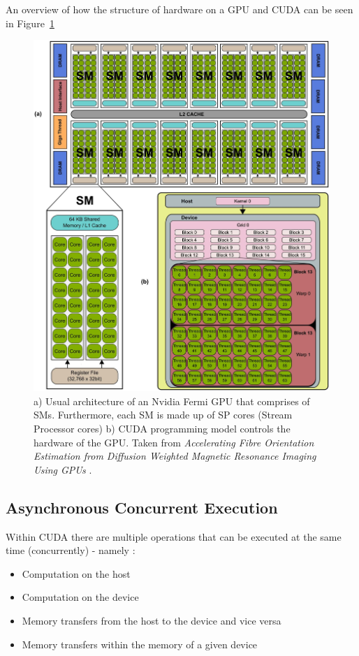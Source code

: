 \par An overview of how the structure of hardware on a GPU and CUDA can be seen in Figure~\ref{Figure:Nvidia-GPU-structure-CUDA-thread-structure}

\begin{figure}[ht!]
	\centering
	\includegraphics[width=\textwidth, keepaspectratio]{images/ch1/nvidia_gpu_sms_cuda.png}
	\caption{a) Usual architecture of an Nvidia Fermi GPU that comprises of SMs. Furthermore, each SM is made up of SP cores (Stream Processor cores) b) CUDA programming model controls the hardware of the GPU. Taken from \emph{Accelerating Fibre Orientation Estimation from Diffusion Weighted Magnetic Resonance Imaging Using GPUs} \cite{Hernandez2013429}.}
	\label{Figure:Nvidia-GPU-structure-CUDA-thread-structure}
\end{figure}

\subsection{Asynchronous Concurrent Execution}\label{Subsection:theory-CUDA-asynchronous-concurrent-execution}
Within CUDA there are multiple operations that can be executed at the same time (concurrently) - namely \cite{NVIDIAMay2022}:
\begin{itemize}
	\item Computation on the host
	\item Computation on the device
	\item Memory transfers from the host to the device and vice versa
	\item Memory transfers within the memory of a given device
\end{itemize}

